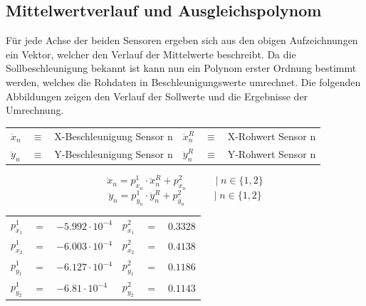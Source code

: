 \newpage
\subsection{Mittelwertverlauf und Ausgleichspolynom}
Für jede Achse der beiden Sensoren ergeben sich aus den obigen Aufzeichnungen ein Vektor, welcher den Verlauf der Mittelwerte beschreibt. Da die Sollbeschleunigung bekannt ist kann nun ein Polynom erster Ordnung bestimmt werden, welches die Rohdaten in Beschleunigungswerte umrechnet. Die folgenden Abbildungen zeigen den Verlauf der Sollwerte und die Ergebnisse der Umrechnung.


\begin{table}[h]
\centering
\begin{tabular}{lcllcl}
$\ddot{x}_n$ &$\equiv$& X-Beschleunigung Sensor n &
$\ddot{x}^R_n$ &$\equiv$& X-Rohwert Sensor n \\
$\ddot{y}_n$ &$\equiv$& Y-Beschleunigung Sensor n &
$\ddot{y}^R_n$ &$\equiv$& Y-Rohwert Sensor n
\end{tabular}
\end{table}

\vspace*{-\baselineskip}
\begin{equation}
\ddot{x}_n = p^1_{x_n} \cdot \ddot{x}^R_n + p^2_{x_n} \hspace{35pt} \vert \hspace{3pt} n \in \{1, 2\}
\end{equation}
\begin{equation}
\ddot{y}_n = p^1_{y_n} \cdot \ddot{y}^R_n + p^2_{y_n} \hspace{35pt} \vert \hspace{3pt} n \in \{1, 2\}
\end{equation}
\vspace*{-\baselineskip}
\begin{table}[h]
\centering
\begin{tabular}{lcllcl}
$p^1_{x_1}$ &$=$& $-5.992 \cdot 10^{-4}$ & $p^2_{x_1}$ &$=$& $0.3328$ \\
$p^1_{x_2}$ &$=$& $-6.003 \cdot 10^{-4}$ & $p^2_{x_2}$ &$=$& $0.4138$ \\
$p^1_{y_1}$ &$=$& $-6.127 \cdot 10^{-4}$ & $p^2_{y_1}$ &$=$& $0.1186$ \\
$p^1_{y_2}$ &$=$& $-6.81 \cdot 10^{-4}$ & $p^2_{y_2}$ &$=$& $0.1143$ \\
\end{tabular}
\end{table}

